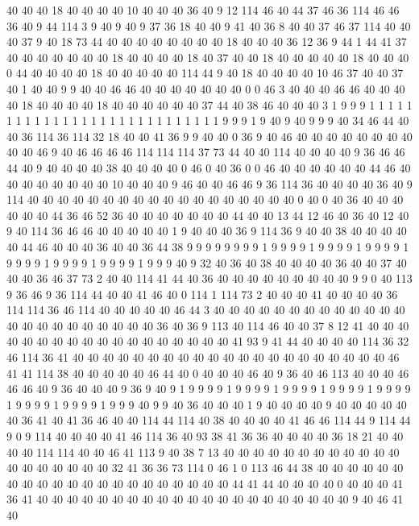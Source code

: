 40 40 40 18 40 40 40 40 10 40 40 40 36 40 9 12 114 46 40 44
37 46 36 114 46 46 36 40 9 44 114 3 9 40 9 40 9 37 36 18
40 40 9 41 40 36 8 40 40 37 46 37 114 40 40 40 37 9 40 18
73 44 40 40 40 40 40 40 40 40 18 40 40 40 36 12 36 9 44 1
44 41 37 40 40 40 40 40 40 40 18 40 40 40 40 18 40 37 40 40
18 40 40 40 40 40 18 40 40 40 0 44 40 40 40 40 18 40 40 40
40 40 114 44 9 40 18 40 40 40 40 10 46 37 40 40 37 40 1 40
40 9 9 40 40 46 46 40 40 40 40 40 40 40 0 0 46 3 40 40
40 46 46 40 40 40 40 18 40 40 40 40 18 40 40 40 40 40 40 37
44 40 38 46 40 40 40 3 1 9 9 9 1 1 1 1 1 1 1 1
1 1 1 1 1 1 1 1 1 1 1 1 1 1 1 1 1 1 1 1
9 9 9 1 9 40 9 40 9 9 9 40 34 46 44 40 40 36 114 36
114 32 18 40 40 41 36 9 9 40 40 0 36 9 40 46 40 40 40 40
40 40 40 40 40 40 46 9 40 46 46 46 46 114 114 114 37 73 44 40
40 114 40 40 40 40 9 36 46 46 44 40 9 40 40 40 40 38 40 40
40 40 0 46 0 40 36 0 0 46 40 40 40 40 40 40 44 46 40 40
40 40 40 40 40 40 10 40 40 40 9 46 40 40 46 46 9 36 114 36
40 40 40 40 36 40 9 114 40 40 40 40 40 40 40 40 40 40 40 40
40 40 40 40 40 40 0 40 0 40 36 40 40 40 40 40 40 44 36 46
52 36 40 40 40 40 40 40 40 44 40 40 13 44 12 46 40 36 40 12
40 9 40 114 36 46 46 40 40 40 40 40 1 9 40 40 40 36 9 114
36 9 40 40 38 40 40 40 40 40 44 46 40 40 40 36 40 40 36 44
38 9 9 9 9 9 9 9 9 1 9 9 9 9 1 9 9 9 9 1
9 9 9 9 1 9 9 9 9 1 9 9 9 9 1 9 9 9 9 1
9 9 9 40 9 32 40 36 40 38 40 40 40 40 36 40 40 37 40 40
40 36 46 37 73 2 40 40 114 41 44 40 36 40 40 40 40 40 40 40
40 40 9 9 0 40 113 9 36 46 9 36 114 44 40 40 41 46 40 0
114 1 114 73 2 40 40 40 41 40 40 40 40 36 114 114 36 46 114 40
40 40 40 40 46 44 3 40 40 40 40 40 40 40 40 40 40 40 40 40
40 40 40 40 40 40 40 40 40 40 36 40 36 9 113 40 114 46 40 40
37 8 12 41 40 40 40 40 40 40 40 40 40 40 40 40 40 40 40 40
40 40 41 93 9 41 44 40 40 40 40 114 36 32 46 114 36 41 40 40
40 40 40 40 40 40 40 40 40 40 40 40 40 40 40 40 40 40 40 46
41 41 114 38 40 40 40 40 40 46 44 40 0 40 40 40 46 40 9 36
40 46 113 40 40 40 46 46 46 40 9 36 40 40 40 9 36 9 40 9
1 9 9 9 9 1 9 9 9 9 1 9 9 9 9 1 9 9 9 9
1 9 9 9 9 1 9 9 9 9 1 9 9 9 9 1 9 9 9 40
9 9 40 36 40 40 40 1 9 40 40 40 40 9 40 40 40 40 40 40
36 41 40 41 36 46 40 40 114 44 114 40 38 40 40 40 40 41 46 46
114 44 9 114 44 9 0 9 114 40 40 40 40 41 46 114 36 40 93 38
41 36 36 40 40 40 40 36 18 21 40 40 40 40 114 114 40 40 46 41
113 9 40 38 7 13 40 40 40 40 40 40 40 40 40 40 40 40 40 40
40 40 40 40 40 32 41 36 36 73 114 0 46 1 0 113 46 44 38 40
40 40 40 40 40 40 40 40 40 40 40 40 40 40 40 40 40 40 40 40
44 41 44 40 40 40 40 0 40 40 40 41 36 41 40 40 40 40 40 40
40 40 40 40 40 40 40 40 40 40 40 40 40 40 40 9 40 46 41 40
